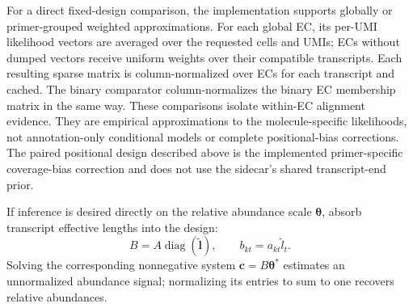 \documentclass[11pt]{article}
\begin{document}
For a direct fixed-design comparison, the implementation supports globally or
primer-grouped weighted approximations. For each global EC, its per-UMI
likelihood vectors are averaged over the requested cells and UMIs; ECs without
dumped vectors receive uniform weights over their compatible transcripts. Each
resulting sparse matrix is column-normalized over ECs for each transcript and
cached. The binary comparator column-normalizes the binary EC membership matrix
in the same way. These comparisons isolate within-EC alignment evidence. They
are empirical approximations to the molecule-specific likelihoods, not
annotation-only conditional models or complete positional-bias corrections.
The paired positional design described above is the implemented
primer-specific coverage-bias correction and does not use the sidecar's shared
transcript-end prior.

If inference is desired directly on the relative abundance scale
\(\boldsymbol{\theta}\), absorb transcript effective lengths into the design:
\[
  B = A\operatorname{diag}(\tilde{\bm{l}}),
  \qquad
  b_{kt}=a_{kt}\tilde{l}_t.
\]
Solving the corresponding nonnegative system
\(\bm{c}=B\boldsymbol{\theta}^*\) estimates an unnormalized abundance signal;
normalizing its entries to sum to one recovers relative abundances.
\end{document}
